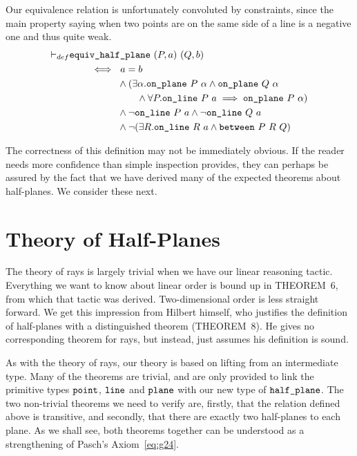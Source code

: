 Our equivalence relation is unfortunately convoluted by constraints, since the main property saying when two points are on the same side of a line is a negative one and thus quite weak.
\begin{equation}\label{eq:SameSidePlaneDef}
  \begin{split}
    \vdash_{def}& \code{equiv\_half\_plane}\ (P,a)\ (Q,b)\\
    & \qquad\iff\ a=b \\
    & \qquad\quad\qquad \wedge (\exists \alpha. \code{on\_plane}\ P\ \alpha \wedge \code{on\_plane}\ Q\ \alpha\\
    & \qquad\quad\qquad\qquad \wedge \forall P. \code{on\_line}\ P\ a \implies \code{on\_plane}\ P\ \alpha)\\
    & \qquad\quad\qquad \wedge \neg\code{on\_line}\ P\ a \wedge \neg\code{on\_line}\ Q\ a\\
    & \qquad\quad\qquad \wedge \neg(\exists R. \code{on\_line}\ R\ a \wedge \between{P}{R}{Q})
  \end{split}
\end{equation}

The correctness of this definition may not be immediately obvious. If the reader needs more confidence than simple inspection provides, they can perhaps be assured by the fact that we have derived many of the expected theorems about half-planes. We consider these next.

\section{Theory of Half-Planes}\label{sec:HalfPlaneTheory}
The theory of rays is largely trivial when we have our linear reasoning tactic. Everything we want to know about linear order is bound up in THEOREM~6, from which that tactic was derived. Two-dimensional order is less straight forward. We get this impression from Hilbert himself, who justifies the definition of half-planes with a distinguished theorem (THEOREM~8). He gives no corresponding theorem for rays, but instead, just assumes his definition is sound.

As with the theory of rays, our theory is based on lifting from an intermediate type. Many of the theorems are trivial, and are only provided to link the primitive types $\texttt{point}$, $\texttt{line}$ and $\texttt{plane}$ with our new type of $\texttt{half\_plane}$. The two non-trivial theorems we need to verify are, firstly, that the relation defined above is transitive, and secondly, that there are exactly two half-planes to each plane. As we shall see, both theorems together can be understood as a strengthening of Pasch's Axiom~\eqref{eq:g24}.


